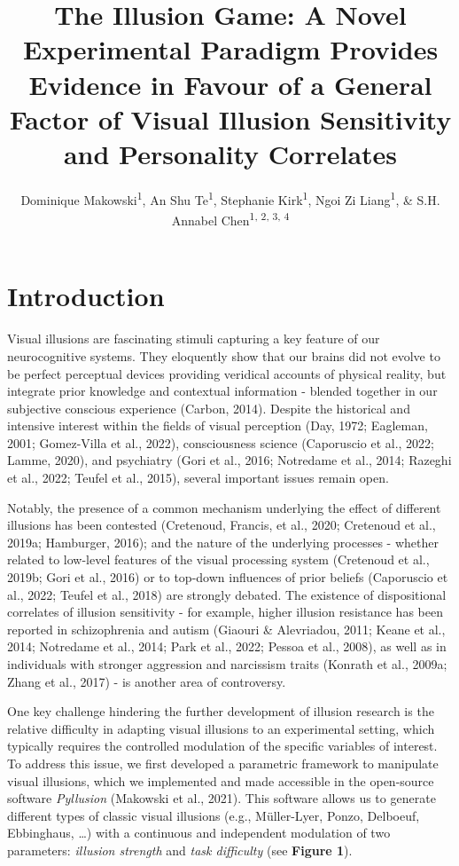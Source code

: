 \documentclass[
  man,floatsintext]{apa6}
\title{\textbf{The Illusion Game: A Novel Experimental Paradigm Provides Evidence in Favour of a General Factor of Visual Illusion Sensitivity and Personality Correlates}}
\author{Dominique Makowski\textsuperscript{1}, An Shu Te\textsuperscript{1}, Stephanie Kirk\textsuperscript{1}, Ngoi Zi Liang\textsuperscript{1}, \& S.H. Annabel Chen\textsuperscript{1, 2, 3, 4}}
\date{}
\affiliation{\vspace{0.5cm}\textsuperscript{1} School of Social Sciences, Nanyang Technological University, Singapore\\\textsuperscript{2} LKC Medicine, Nanyang Technological University, Singapore\\\textsuperscript{3} National Institute of Education, Singapore\\\textsuperscript{4} Centre for Research and Development in Learning, Nanyang Technological University, Singapore}
\begin{document}
\maketitle

\hypertarget{introduction}{%
\section{Introduction}\label{introduction}}

Visual illusions are fascinating stimuli capturing a key feature of our neurocognitive systems. They eloquently show that our brains did not evolve to be perfect perceptual devices providing veridical accounts of physical reality, but integrate prior knowledge and contextual information - blended together in our subjective conscious experience (Carbon, 2014). Despite the historical and intensive interest within the fields of visual perception (Day, 1972; Eagleman, 2001; Gomez-Villa et al., 2022), consciousness science (Caporuscio et al., 2022; Lamme, 2020), and psychiatry (Gori et al., 2016; Notredame et al., 2014; Razeghi et al., 2022; Teufel et al., 2015), several important issues remain open.

Notably, the presence of a common mechanism underlying the effect of different illusions has been contested (Cretenoud, Francis, et al., 2020; Cretenoud et al., 2019a; Hamburger, 2016); and the nature of the underlying processes - whether related to low-level features of the visual processing system (Cretenoud et al., 2019b; Gori et al., 2016) or to top-down influences of prior beliefs (Caporuscio et al., 2022; Teufel et al., 2018) are strongly debated. The existence of dispositional correlates of illusion sensitivity - for example, higher illusion resistance has been reported in schizophrenia and autism (Giaouri \& Alevriadou, 2011; Keane et al., 2014; Notredame et al., 2014; Park et al., 2022; Pessoa et al., 2008), as well as in individuals with stronger aggression and narcissism traits (Konrath et al., 2009a; Zhang et al., 2017) - is another area of controversy.

One key challenge hindering the further development of illusion research is the relative difficulty in adapting visual illusions to an experimental setting, which typically requires the controlled modulation of the specific variables of interest. To address this issue, we first developed a parametric framework to manipulate visual illusions, which we implemented and made accessible in the open-source software \emph{Pyllusion} (Makowski et al., 2021). This software allows us to generate different types of classic visual illusions (e.g., Müller-Lyer, Ponzo, Delboeuf, Ebbinghaus, \ldots) with a continuous and independent modulation of two parameters: \emph{illusion strength} and \emph{task difficulty} (see \textbf{Figure 1}).
\end{document}
